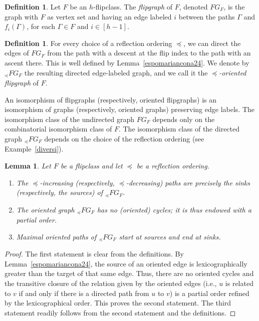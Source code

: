 \documentclass[12pt,reqno]{amsart}
\theoremstyle{plain}
\newtheorem{lem}[thm]{Lemma}
\theoremstyle{definition}
\newtheorem{defn}[thm]{Definition}
\theoremstyle{remark}
\begin{document}
\begin{defn}
 Let $F$ be an $h$-flipclass. The \emph{flipgraph} of $F$, denoted $FG_F$, is the graph with $F$ as vertex set and having an edge labeled $i$ between the paths $\Gamma$ and $f_i(\Gamma)$, for each $\Gamma \in F$ and $i\in[h-1]$.
\end{defn}
\begin{defn}
For every choice of a reflection ordering $\preceq$, we can direct the edges of $FG_F$ from the path with a descent at the flip index to the path with an ascent there. This is well defined by Lemma~\ref{espomariancona24}. We denote by $_{\preceq} FG_F$ the resulting directed edge-labeled graph, and we call it the \emph{$\preceq$-oriented flipgraph} of $F$.
\end{defn}

An isomorphism of flipgraphs (respectively, oriented flipgraphs) is an isomorphism of graphs (respectively, oriented graphs) preserving edge labels. 
The isomorphism class of the undirected graph $FG_F$ depends only on the combinatorial isomorphism class of $F$. 
The isomorphism class of the directed graph $_{\preceq} FG_F$ depends on the choice of the reflection ordering (see Example~\ref{diversi}).




\begin{lem}\label{loreto}
 Let $F$ be a flipclass and let $\preceq$ be a reflection ordering.
\begin{enumerate}
\item The $\preceq$-increasing (respectively,  $\preceq$-decreasing) paths are precisely the sinks (respectively, the sources) of  $_{\preceq} FG_F$.

\item The oriented graph $_{\preceq} FG_F$ has no (oriented) cycles; it is thus endowed with a partial order.

\item Maximal oriented paths of $_{\preceq} FG_F$ start at sources and end at sinks.
\end{enumerate}
\end{lem}
\begin{proof}
The first statement is clear from the definitions.
By Lemma~\ref{espomariancona24}, the source of an oriented edge is lexicographically greater than the target of that same edge. Thus, there are no oriented cycles and the transitive closure of the relation given by the oriented edges (i.e., $u$ is related to $v$ if and only if there is a directed path from $u$ to $v$) is a partial order refined by the lexicographical order.
This proves the second statement.
The third statement readily follows from the second statement and the definitions.
\end{proof}
\end{document}
